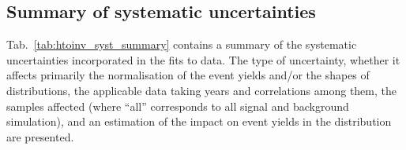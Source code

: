 

\subsection{Summary of systematic uncertainties}
\label{subsec:htoinv_syst_summary}

Tab.~\ref{tab:htoinv_syst_summary} contains a summary of the systematic uncertainties incorporated in the fits to data. The type of uncertainty, whether it affects primarily the normalisation of the event yields and/or the shapes of distributions, the applicable data taking years and correlations among them, the samples affected (where ``all'' corresponds to all signal and background simulation), and an estimation of the impact on event yields in the \ptmiss distribution are presented.

